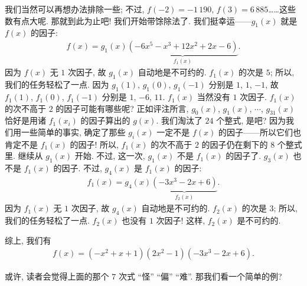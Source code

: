 \begin{example}
    我们当然可以再想办法排除一些; 不过, $f(-2) = -1\,190$, $f(3) = 6\,885$……这些数有点大呢. 那就到此为止吧! 我们开始带馀除法了. 我们挺幸运——$g_1 (x)$ 就是 $f(x)$ 的因子:
    \begin{align*}
        f(x) = g_1 (x) \underbrace{(-6 x^5-x^3+12 x^2+2 x-6)}_{f_1 (x)}.
    \end{align*}
    因为 $f(x)$ 无 $1$ 次因子, 故 $g_1 (x)$ 自动地是不可约的. $f_1 (x)$ 的次是 $5$; 所以, 我们的任务轻松了一点. 因为 $g_1 (1)$, $g_1 (0)$, $g_1 (-1)$ 分别是 $1$, $1$, $-1$, 故 $f_1 (1)$, $f_1 (0)$, $f_1 (-1)$ 分别是 $1$, $-6$, $11$. $f_1 (x)$ 当然没有 $1$ 次因子. $f_1 (x)$ 的次不高于 $2$ 的因子可能有哪些呢? 正如评注所言, $g_0 (x)$, $g_1 (x)$, $\cdots$, $g_{31} (x)$ 恰好是用诸 $f_1 (x_i)$ 的因子算出的 $g(x)$. 我们淘汰了 $24$ 个整式, 是吧? 因为我们用一些简单的事实, 确定了那些 $g_i (x)$ 一定不是 $f(x)$ 的因子——所以它们也肯定不是 $f_1 (x)$ 的因子! 所以, $f_1 (x)$ 的次不高于 $2$ 的因子仍在剩下的 $8$ 个整式里. 继续从 $g_1 (x)$ 开始. 不过, 这一次, $g_1 (x)$ 不是 $f_1 (x)$ 的因子了. $g_3 (x)$ 也不是 $f_1 (x)$ 的因子. 不过, $g_4 (x)$ 是 $f_1 (x)$ 的因子:
    \begin{align*}
        f_1 (x) = g_4 (x) \underbrace{(-3 x^3-2 x+6)}_{f_2 (x)}.
    \end{align*}
    因为 $f_1 (x)$ 无 $1$ 次因子, 故 $g_4 (x)$ 自动地是不可约的. $f_2 (x)$ 的次是 $3$; 所以, 我们的任务轻松了一点. $f_2 (x)$ 也没有 $1$ 次因子! 这样, $f_2 (x)$ 是不可约的.

    综上, 我们有
    \begin{align*}
        f(x) = (-x^2+x+1) (2x^2-1) (-3x^3-2x+6).
    \end{align*}
\end{example}

或许, 读者会觉得上面的那个 $7$ 次式 ``怪'' ``偏'' ``难''. 那我们看一个简单的例?

